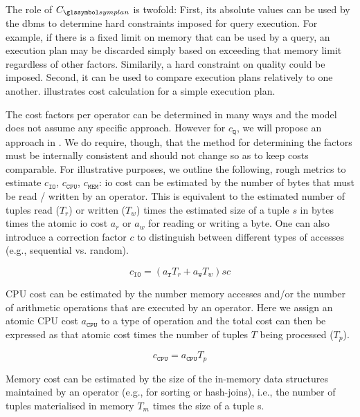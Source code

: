 The role of $C_{\symplan}$ is twofold: First, its absolute values can be used by the \acrshort{dbms} to determine hard constraints imposed for query execution. For example, if there is a fixed limit on memory that can be used by a query, an execution plan may be discarded simply based on exceeding that memory limit regardless of other factors. Similarily, a hard constraint on quality could be imposed. Second, it can be used to compare execution plans relatively to one another.  illustrates cost calculation for a simple execution plan.

The cost factors per operator can be determined in many ways and the model does not assume any specific approach. However for $c_{\mathtt{Q}}$, we will propose an approach in . We do require, though, that the method for determining the factors must be internally consistent and should not change so as to keep costs comparable. For illustrative purposes, we outline the following, rough metrics to estimate $c_{\mathtt{IO}}$, $c_{\mathtt{CPU}}$, $c_{\mathtt{MEM}}$: \acrshort{io} cost can be estimated by the number of bytes that must be read / written by an operator. This is equivalent to the estimated number of tuples read ($T_r$) or written ($T_w$) times the estimated size of a tuple $s$ in bytes times the atomic \acrshort{io} cost $a_{r}$ or $a_{w}$ for reading or writing a byte. One can also introduce a correction factor $c$ to distinguish between different types of accesses (e.g., sequential vs. random).

\begin{equation*}
    c_{\mathtt{IO}} = (a_{\texttt{r}}T_r + a_{\texttt{w}}T_w)sc
\end{equation*}

CPU cost can be estimated by the number memory accesses and/or the number of arithmetic operations that are executed by an operator. Here we assign an atomic CPU cost $a_{\texttt{CPU}}$ to a type of operation and the total cost can then be expressed as that atomic cost times the number of tuples $T$ being processed ($T_p$).

\begin{equation*}
    c_{\mathtt{CPU}} = a_{\texttt{CPU}}T_p
\end{equation*}

Memory cost can be estimated by the size of the in-memory data structures maintained by an operator (e.g., for sorting or hash-joins), i.e., the number of tuples materialised in memory $T_m$ times the size of a tuple s.

